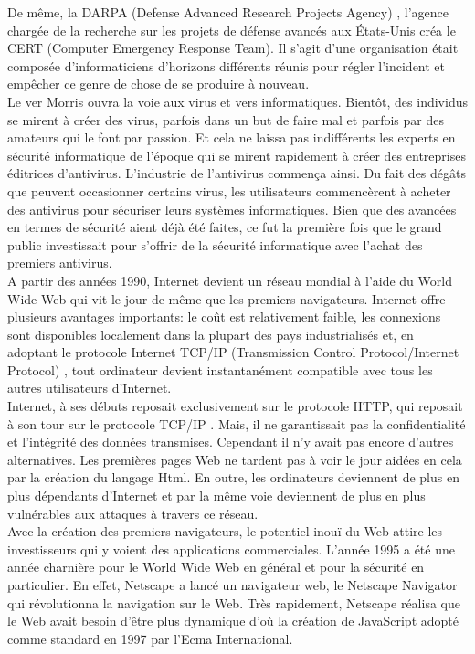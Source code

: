 De même, la DARPA (Defense Advanced Research Projects Agency) , l'agence chargée de la recherche sur les projets de défense avancés aux États-Unis créa le CERT  (Computer Emergency Response Team). Il s'agit d'une organisation était composée d’informaticiens d’horizons différents réunis pour régler l’incident et empêcher ce genre de chose de se produire à nouveau. \\
Le ver Morris ouvra la voie aux virus et vers informatiques. Bientôt, des individus se mirent à créer des virus, parfois dans un but de faire mal et parfois par des amateurs qui le font par passion. Et cela ne laissa pas indifférents les experts en sécurité informatique de l’époque qui se mirent rapidement à créer des entreprises éditrices d’antivirus. L’industrie de l’antivirus commença ainsi. Du fait des dégâts que peuvent occasionner certains virus, les utilisateurs commencèrent à acheter des antivirus pour sécuriser leurs systèmes informatiques. Bien que des avancées en termes de sécurité aient déjà été faites, ce fut la première fois que le grand public investissait pour s’offrir de la sécurité informatique avec l’achat des premiers antivirus.\\
A partir des années 1990, Internet devient un réseau mondial à l’aide du World Wide Web qui vit le jour de même que les premiers navigateurs. Internet offre plusieurs avantages importants: le coût est relativement faible, les connexions sont disponibles localement dans la plupart des pays industrialisés et, en adoptant le protocole Internet TCP/IP (Transmission Control Protocol/Internet Protocol) , tout ordinateur devient instantanément compatible avec tous les autres utilisateurs d'Internet. \\
Internet, à ses débuts reposait exclusivement sur le protocole HTTP, qui reposait à son tour sur le protocole TCP/IP \cite{internet}. Mais, il ne garantissait pas la confidentialité et l’intégrité des données transmises. Cependant il n’y avait pas encore d’autres alternatives.
Les premières pages Web ne tardent pas à voir le jour aidées en cela par la création du langage Html. En outre, les ordinateurs deviennent de plus en plus dépendants d’Internet et par la même voie deviennent de plus en plus vulnérables aux attaques à travers ce réseau.\\
Avec la création des premiers navigateurs, le potentiel inouï du Web attire les investisseurs qui y voient des applications commerciales. L'année 1995 a été une année charnière pour le World Wide Web en général et pour la sécurité en particulier. En effet, Netscape a lancé un navigateur web, le Netscape Navigator qui révolutionna la navigation sur le Web. Très rapidement, Netscape réalisa que le Web avait besoin d’être plus dynamique d’où la création de JavaScript adopté comme standard en 1997 par l’Ecma International. \\
